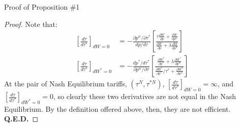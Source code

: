 \documentclass[aspectratio=169]{beamer}
\begin{document}
\begin{frame}{Proof of Proposition \#1}

\begin{proof}
    Note that:
    \begin{align}
        \left[ \frac{d \tau}{d \tau^{*}} \right]_{dW = 0} &= -\frac{\partial p^{w} / \partial \tau^{*}}{d p / d \tau}\left[ \frac{\tau \frac{\partial W}{\partial p} + \frac{\partial W}{\partial p^{w}}}{\frac{\partial W}{\partial p} + \lambda \frac{\partial W}{\partial p^{w}}} \right] \label{eq:dtaudtau*home} \\
        \left[ \frac{d \tau}{d \tau^{*}} \right]_{dW^{*} = 0} &= -\frac{d p^{*} / d \tau^{*}}{\partial p^{w} / \partial \tau}\left[ \frac{\frac{\partial W^{*}}{\partial p^{*}} + \lambda \frac{\partial W^{*}}{\partial p^{w}}}{\frac{\partial W^{*}}{\partial p^{*}} / \tau^{*} + \frac{\partial W^{*}}{\partial p^{w}}}{} \right] \label{eq:dtaudtau*foreign}
    \end{align}
    At the pair of Nash Equilibrium tariffs, $ \left( \tau^{N}, \tau^{* N} \right) $, $ \left[ \frac{d \tau}{d \tau^{*}} \right]_{dW = 0} = \infty $, and $ \left[ \frac{d \tau}{d \tau^{*}} \right]_{dW^{*} = 0} = 0 $, so clearly these two derivatives are not equal in the Nash Equilibrium.  By the definition offered above, then, they are not efficient.  \textbf{Q.E.D.}
\end{proof}
    
\end{frame}

\end{document}
